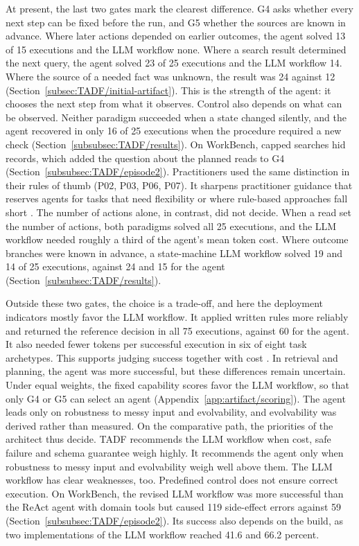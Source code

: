 At present, the last two gates mark the clearest difference. G4 asks whether every next step can be fixed before the run, and G5 whether the sources are known in advance. Where later actions depended on earlier outcomes, the agent solved 13 of 15 executions and the LLM workflow none. Where a search result determined the next query, the agent solved 23 of 25 executions and the LLM workflow 14. Where the source of a needed fact was unknown, the result was 24 against 12 (Section~\ref{subsec:TADF/initial-artifact}). This is the strength of the agent: it chooses the next step from what it observes. Control also depends on what can be observed. Neither paradigm succeeded when a state changed silently, and the agent recovered in only 16 of 25 executions when the procedure required a new check (Section~\ref{subsubsec:TADF/results}). On WorkBench, capped searches hid records, which added the question about the planned reads to G4 (Section~\ref{subsubsec:TADF/episode2}). Practitioners used the same distinction in their rules of thumb (P02, P03, P06, P07). It sharpens practitioner guidance that reserves agents for tasks that need flexibility or where rule-based approaches fall short \parencite{schluntzBuildingEffectiveAI2024,openaiPracticalGuideAgents2026}. The number of actions alone, in contrast, did not decide. When a read set the number of actions, both paradigms solved all 25 executions, and the LLM workflow needed roughly a third of the agent's mean token cost. Where outcome branches were known in advance, a state-machine LLM workflow solved 19 and 14 of 25 executions, against 24 and 15 for the agent (Section~\ref{subsubsec:TADF/results}).

Outside these two gates, the choice is a trade-off, and here the deployment indicators mostly favor the LLM workflow. It applied written rules more reliably and returned the reference decision in all 75 executions, against 60 for the agent. It also needed fewer tokens per successful execution in six of eight task archetypes. This supports judging success together with cost \parencite{kapoorAIAgentsThat2024}. In retrieval and planning, the agent was more successful, but these differences remain uncertain. Under equal weights, the fixed capability scores favor the LLM workflow, so that only G4 or G5 can select an agent (Appendix~\ref{app:artifact/scoring}). The agent leads only on robustness to messy input and evolvability, and evolvability was derived rather than measured. On the comparative path, the priorities of the architect thus decide. TADF recommends the LLM workflow when cost, safe failure and schema guarantee weigh highly. It recommends the agent only when robustness to messy input and evolvability weigh well above them. The LLM workflow has clear weaknesses, too. Predefined control does not ensure correct execution. On WorkBench, the revised LLM workflow was more successful than the ReAct agent with domain tools but caused 119 side-effect errors against 59 (Section~\ref{subsubsec:TADF/episode2}). Its success also depends on the build, as two implementations of the LLM workflow reached 41.6 and 66.2 percent.

